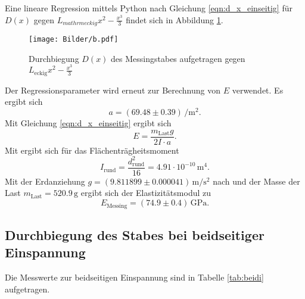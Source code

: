 Eine lineare Regression mittels Python nach Gleichung \eqref{eqn:d_x_einseitig} für $D(x)$ gegen $L_{mathrm{eckig}}x^2-\frac{x^3}{3}$
findet sich in Abbildung \ref{fig:messing_einseitig}.

\begin{figure}
	\centering
	\texttt{[image: Bilder/b.pdf]}
	\caption{Durchbiegung $D(x)$ des Messingstabes aufgetragen gegen $L_{\mathrm{eckig}}x^2-\frac{x^3}{3}$}
	\label{fig:messing_einseitig}
\end{figure}
Der Regressionsparameter wird erneut zur Berechnung von $E$ verwendet.
Es ergibt sich
\begin{equation*}
	a=(69.48 \pm 0.39) \,\si{\per\square\meter} \text{.}
\end{equation*}
Mit Gleichung \eqref{eqn:d_x_einseitig} ergibt sich
\begin{equation}
	E=\frac{m_{\mathrm{Last}}g}{2I\cdot a} \text{.}
\end{equation}
Mit \cite{bla} ergibt sich für das Flächenträgheitsmoment
\begin{equation}
	I_{\mathrm{rund}}=\frac{d_{\mathrm{rund}}^2}{16}= 4.91 \cdot 10^{-10} \,\si{\meter\tothe{4}}	 \text{.}
\end{equation}
Mit der Erdanziehung $g=(9.811899 \pm 0.000041) \,\si{\meter\per\square\second}$ nach \cite{G} und der Masse der Last $m_{\mathrm{Last}}=520.9\,\si{\gram}$ ergibt sich der Elastizitätsmodul zu
\begin{equation*}
	E_{\mathrm{Messing}}= (74.9 \pm 0.4)\,\si{\giga\pascal} \text{.}
\end{equation*}

\FloatBarrier
\subsection{Durchbiegung des Stabes bei beidseitiger Einspannung}

Die Messwerte zur beidseitigen Einspannung sind in Tabelle \ref{tab:beidi} aufgetragen.



